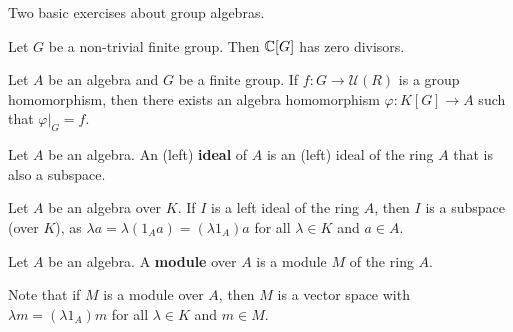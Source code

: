 Two basic exercises about group algebras.
 
\begin{exercise}
	Let $G$ be a non-trivial finite group. 
	Then $\mathbb{C}[G]$ has zero divisors. 
\end{exercise}

\begin{exercise}
	Let $A$ be an algebra and $G$ be a finite group. 
	If $f\colon G\to\mathcal{U}(R)$ is a group homomorphism, 
	then there exists an algebra homomorphism 
	$\varphi\colon K[G]\to A$ such that $\varphi|_G=f$.   	
\end{exercise}


\begin{definition}
	Let $A$ be an algebra. An (left) \textbf{ideal} of $A$ is an 
	(left) ideal of the ring $A$ that is also a subspace. 
\end{definition}

Let $A$ be an algebra over $K$. If $I$ is a left ideal of the ring $A$, then 
$I$ is a subspace (over $K$), as $\lambda a=\lambda(1_Aa)=(\lambda 1_A)a$ 
for all $\lambda\in K$ and $a\in A$.  
%

\begin{definition}
	Let $A$ be an algebra. A \textbf{module} over $A$ is a module $M$ of the ring $A$. 
\end{definition}

Note that if $M$ is a module over $A$, 
then $M$ is a vector space 
with $\lambda m=(\lambda 1_A)m$ for all $\lambda\in K$ and $m\in M$. 
%


